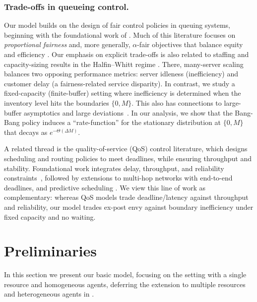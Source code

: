 \documentclass[mnsc,nonblindrev]{informs3}
\renewcommand{\paragraph}[1]{\subsubsection*{#1}}
\begin{document}
\paragraph{Trade-offs in queueing control.}
Our model builds on the design of fair control policies in queuing systems, beginning with the foundational work of \citet{kelly1998rate}. Much of this literature focuses on \emph{proportional fairness} and, more generally, $\alpha$-fair objectives that balance equity and efficiency \citep{abbas2015fairness,raz2004resource}. Our emphasis on explicit trade-offs is also related to staffing and capacity-sizing results in the Halfin–Whitt regime \citep{halfin1981heavy}.  There, many-server scaling balances two opposing performance metrics: server idleness (inefficiency) and customer delay (a fairness-related service disparity).  In contrast, we study a fixed-capacity (finite-buffer) setting where inefficiency is determined when the inventory level hits the boundaries $\{0,M\}$.  This also has connections to large-buffer asymptotics and large deviations~\citep{ganeshbig}. In our analysis, we show that the Bang-Bang policy induces a ``rate-function'' for the stationary distribution at $\{0,M\}$ that decays as $e^{-\Theta(\Delta M)}$.


A related thread is the quality-of-service (QoS) control literature, which designs scheduling and routing policies to meet deadlines, while ensuring throughput and stability. Foundational work integrates delay, throughput, and reliability constraints~\citep{hou2009theory}, followed by extensions to multi-hop networks with end-to-end deadlines, and predictive scheduling \citep{singh2018throughput,chen2018timely}. We view this line of work as complementary: whereas QoS models trade deadline/latency against throughput and reliability, our model trades ex-post envy against boundary inefficiency under fixed capacity and no waiting.
\section{Preliminaries}
\label{sec:model}

In this section we present our basic model, focusing on the setting with a single resource and homogeneous agents, deferring the extension to multiple resources and heterogeneous agents in .
\end{document}
